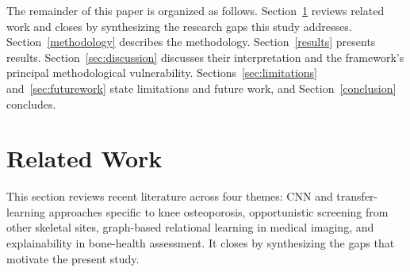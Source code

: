 \documentclass[journal]{IEEEtran}
\begin{document}
The remainder of this paper is organized as follows.
Section~\ref{Literature} reviews related work and closes by synthesizing the
research gaps this study addresses. Section~\ref{methodology} describes the
methodology. Section~\ref{results} presents results.
Section~\ref{sec:discussion} discusses their interpretation and the framework's
principal methodological vulnerability. Sections~\ref{sec:limitations}
and~\ref{sec:futurework} state limitations and future work, and
Section~\ref{conclusion} concludes.

\section{Related Work} \label{Literature}
This section reviews recent literature across four themes: CNN and
transfer-learning approaches specific to knee osteoporosis, opportunistic
screening from other skeletal sites, graph-based relational learning in medical
imaging, and explainability in bone-health assessment. It closes by
synthesizing the gaps that motivate the present study.
\end{document}
